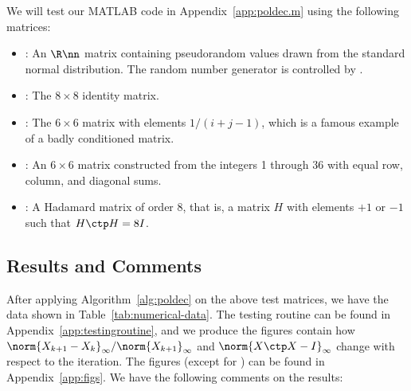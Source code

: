 \documentclass{article}
\numberwithin{equation}{section} %
\newcommand{\gnorm}[1]{\norm{#1}}
\begin{document}
We will test our MATLAB code in Appendix~\ref{app:poldec.m} using the
following matrices:
\begin{itemize}
\item {} : An $\R\nn$ matrix containing pseudorandom values
drawn from the standard normal distribution. The random number generator is
controlled by .
\item {} : The $8\times 8$ identity matrix.
\item {} : The $6\times 6$ matrix with elements $1/(i+j-1)$,
which is a famous example of a badly conditioned matrix.
\item {} : An $6\times 6$ matrix constructed from the
integers 1 through 36 with equal row, column, and diagonal sums.
\item {} : A Hadamard matrix of order 8, that is, a
matrix $H$ with elements $+1$ or $-1$ such that $H\ctp H = 8I$.
\end{itemize}

\subsection{Results and Comments}
After applying Algorithm~\ref{alg:poldec} on the above test matrices, we
have the data shown in Table~\ref{tab:numerical-data}. The testing routine
can be found in Appendix~\ref{app:testingroutine}, and we produce the
figures contain how $\gnorm{X_{k+1} - X_{k}}_\infty/\gnorm{X_{k+1}}_\infty$
and $\gnorm{X\ctp X - I}_\infty$ change with respect to the iteration. The
figures (except for ) can be found in
Appendix~\ref{app:figs}. We have the following comments on the results:
\end{document}
